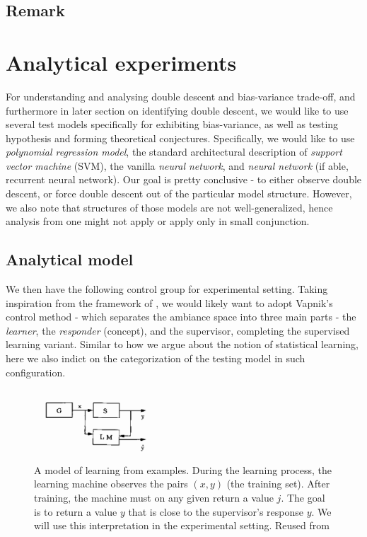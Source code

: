 \documentclass{article}
\begin{document}
\subsection{Remark}


\clearpage

\section{Analytical experiments}
For understanding and analysing double descent and bias-variance trade-off, and furthermore in later section on identifying double descent, we would like to use several test models specifically for exhibiting bias-variance, as well as testing hypothesis and forming theoretical conjectures. Specifically, we would like to use \textit{polynomial regression model}, the standard architectural description of \textit{support vector machine} (SVM), the vanilla \textit{neural network}, and \textit{neural network} (if able, recurrent neural network). Our goal is pretty conclusive - to either observe double descent, or force double descent out of the particular model structure. However, we also note that structures of those models are not well-generalized, hence analysis from one might not apply or apply only in small conjunction. 

\subsection{Analytical model}

We then have the following control group for experimental setting. Taking inspiration from the framework of \cite{Vapnik1999-VAPTNO}, we would likely want to adopt Vapnik's control method - which separates the ambiance space into three main parts - the \textit{learner}, the \textit{responder} (concept), and the supervisor, completing the supervised learning variant. Similar to how we argue about the notion of statistical learning, here we also indict on the categorization of the testing model in such configuration. 

\begin{figure}
    \centering
    \includegraphics[width=0.4\textwidth]{img/vapniksetting.png}
    \caption{A model of learning from examples. During the learning process, the learning machine observes the pairs $(x, y)$ (the training set). After training, the machine must on any given return a value $j$. The goal is to return a value $y$ that is close to the supervisor's response $y$. We will use this interpretation in the experimental setting. Reused from \cite{Vapnik1999-VAPTNO}}
\end{figure}
\end{document}
